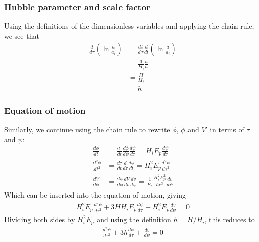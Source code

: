 \documentclass[reprint,english,notitlepage]{revtex4-1}  %
\numberwithin{equation}{section}
\begin{document}
\subsubsection{Hubble parameter and scale factor}
Using the definitions of the dimensionless variables and applying the chain rule,
we see that
\begin{align}
	\frac{d}{d\tau}\left(\ln \frac{a}{a_i}\right)
				&= \frac{dt}{d\tau}\frac{d}{dt}\left(\ln \frac{a}{a_i}\right) \\
				&= \frac{1}{H_i} \frac{\dot{a}}{a} \\
				&= \frac{H}{H_i} \\
				&= h
\end{align}
\subsubsection{Equation of motion}
Similarly, we continue using the chain rule to rewrite $\dot{\phi}$,
$\ddot{\phi}$ and $V$' in terms of $\tau$ and $\psi$:
\begin{align}
	\frac{d\phi}{dt} &= \frac{d\tau}{dt}\frac{d\phi}{d\psi}\frac{d\psi}{d\tau} \label{eq:dphidt}
									 = H_i E_p \frac{d\psi}{d\tau} \\
  \frac{d^2\phi}{dt^2} &= \frac{d\tau}{dt}\frac{d}{d\tau}\frac{d\phi}{dt}
									 = H_i^2 E_p \frac{d^2\psi}{d\tau^2} \\
	\frac{dV}{d\phi} &= \frac{d\psi}{d\phi}\frac{dV}{dv}\frac{dv}{d\psi}
									 = \frac{1}{E_p} \frac{H_i^2 E_p^2}{\hbar c^3} \frac{dv}{d\psi}
\end{align}
Which can be inserted into the equation of motion, giving
\begin{align}
	H_i^2 E_p \frac{d^2\psi}{d\tau^2} + 3H H_i E_p \frac{d\psi}{d\tau}
				+ H_i^2 E_p \frac{dv}{d\psi} = 0
\end{align}
Dividing both sides by $H_i^2 E_p$ and using the definition $h=H/H_i$, this
reduces to
\begin{align}
	\frac{d^2\psi}{d\tau^2} + 3h\frac{d\psi}{d\tau} + \frac{dv}{d\psi} = 0 \label{eq:eom}
\end{align}
\end{document}
